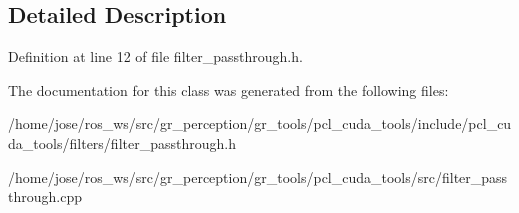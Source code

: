 \subsection{Detailed Description}


Definition at line 12 of file filter\+\_\+passthrough.\+h.



The documentation for this class was generated from the following files\+:\begin{DoxyCompactItemize}
\item 
/home/jose/ros\+\_\+ws/src/gr\+\_\+perception/gr\+\_\+tools/pcl\+\_\+cuda\+\_\+tools/include/pcl\+\_\+cuda\+\_\+tools/filters/filter\+\_\+passthrough.\+h\item 
/home/jose/ros\+\_\+ws/src/gr\+\_\+perception/gr\+\_\+tools/pcl\+\_\+cuda\+\_\+tools/src/filter\+\_\+passthrough.\+cpp\end{DoxyCompactItemize}
